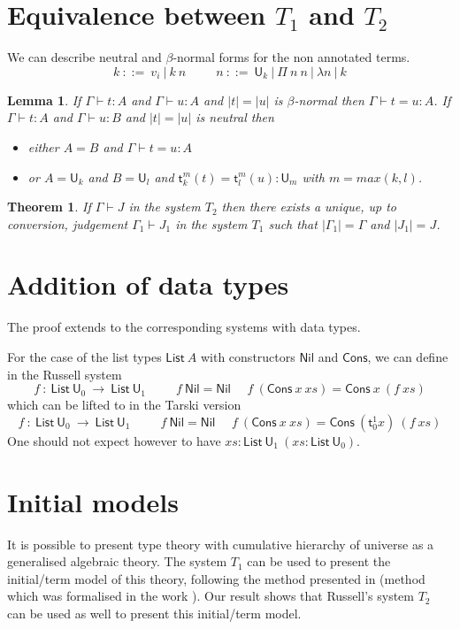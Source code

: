 \documentclass[11pt,a4paper]{article}
\newtheorem{theorem}{Theorem}[section]
\newtheorem{lemma}{Lemma}[theorem]
\theoremstyle{definition}
\def\UU{\mathsf{U}}
\def\List{\mathsf{List}}
\def\Cons{\mathsf{Cons}}
\def\Nil{\mathsf{Nil}}
\newcommand{\sT}{\mathsf{t}}
\begin{document}
\section{Equivalence between $T_1$ and $T_2$}

We can describe neutral and $\beta$-normal forms for the non annotated terms.
$$
k~::=~v_i~|~k~n~~~~~~~~~~~n~::=~\UU_k~|~\Pi~n~n~|~\lambda n~|~k
$$


\begin{lemma}
  If $\Gamma\vdash t:A$ and $\Gamma\vdash u:A$ and $|t| = |u|$ is $\beta$-normal then $\Gamma\vdash t = u:A$.
  If $\Gamma\vdash t:A$ and $\Gamma\vdash u:B$ and $|t| = |u|$ is neutral then
  \begin{itemize}
    \item either $A = B$
      and $\Gamma\vdash t = u:A$
    \item or $A = \UU_k$ and $B = \UU_l$ and $\sT_k^m(t) = \sT_l^m(u):\UU_m$ with $m = max(k,l)$.
  \end{itemize}
\end{lemma}

\begin{theorem}
  If $\Gamma\vdash J$ in the system $T_2$ then there exists a unique, up to conversion, judgement $\Gamma_1\vdash J_1$
  in the system $T_1$ such that $|\Gamma_1| = \Gamma$ and $|J_1| = J$.
\end{theorem}

\section{Addition of data types}

The proof extends to the corresponding systems with data types.

For the case of the list types $\List~A$ with constructors $\Nil$ and $\Cons$, we can define in the Russell system
$$
f~:~\List~\UU_0~\rightarrow~\List~\UU_1~~~~~~~~~~~
f~\Nil = \Nil~~~~~~f~(\Cons~x~xs) = \Cons~x~(f~xs)
$$
which can be lifted to in the Tarski version
$$
f~:~\List~\UU_0~\rightarrow~\List~\UU_1~~~~~~~~~~~
f~\Nil = \Nil~~~~~~f~(\Cons~x~xs) = \Cons~(\sT_0^1 x)~(f~xs)
$$
One should not expect however to have $xs:\List~\UU_1~(xs:\List~\UU_0)$.

\section{Initial models}

It is possible to present type theory with cumulative hierarchy of universe as a generalised algebraic theory.
The system $T_1$ can be used to present the initial/term model of this theory, following the method presented in \cite{Streicher:semtt}
(method which was formalised in the work \cite{brunerie:initiality}).
Our result shows that Russell's system $T_2$ can be used as well to present this initial/term model.





\end{document}
